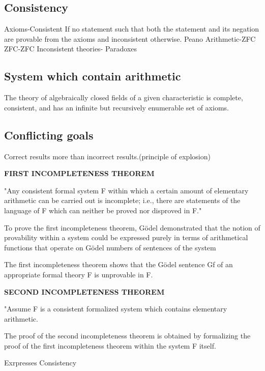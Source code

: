 \documentclass{article}
\begin{document}
\subsection{Consistency}
Axioms-Consistent  If no statement such that both the statement and its negation are provable from the axioms and inconsistent otherwise.
Peano Arithmetic-ZFC
ZFC-ZFC
Inconsistent theories- Paradoxes

\subsection{System which contain arithmetic}
The theory of algebraically closed fields of a given characteristic is complete, consistent, and has an infinite but recursively enumerable set of axioms.

\subsection{Conflicting goals}
Correct results more than incorrect results.(principle of explosion)\par




\textbf{FIRST INCOMPLETENESS THEOREM} \par


"Any consistent formal system F within which a certain amount of elementary arithmetic can be carried out is incomplete; i.e., there are statements of the language of F which can neither be proved nor disproved in F."\par


To prove the first incompleteness theorem, Gödel demonstrated that the notion of provability within a system could be expressed purely in terms of arithmetical functions that operate on Gödel numbers of sentences of the system


The first incompleteness theorem shows that the Gödel sentence Gf of an appropriate formal theory F is unprovable in F.



\textbf{SECOND INCOMPLETENESS THEOREM}

 "Assume F is a consistent formalized system which contains elementary arithmetic. 



 The proof of the second incompleteness theorem is obtained by formalizing the proof of the first incompleteness theorem within the system F itself.

Exrpresses Consistency
\end{document}

